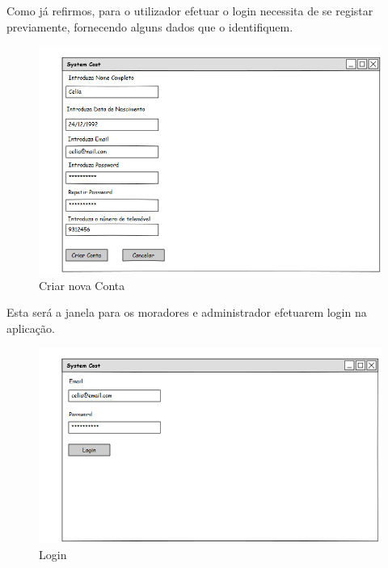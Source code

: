 Como já refirmos, para o utilizador efetuar o login necessita de se registar previamente, fornecendo alguns dados que o identifiquem. 
\begin{figure}[htb!]
	\centering
	\includegraphics[scale=0.5]{imagens/mockups/CriarConta}  
	\caption{Criar nova Conta }  
\end{figure}

Esta será a janela para os moradores e administrador efetuarem login na aplicação. 
\begin{figure}[htb!]
	\centering
	\includegraphics[scale=0.5]{imagens/mockups/MLogin}  
	\caption{Login}  
\end{figure}

